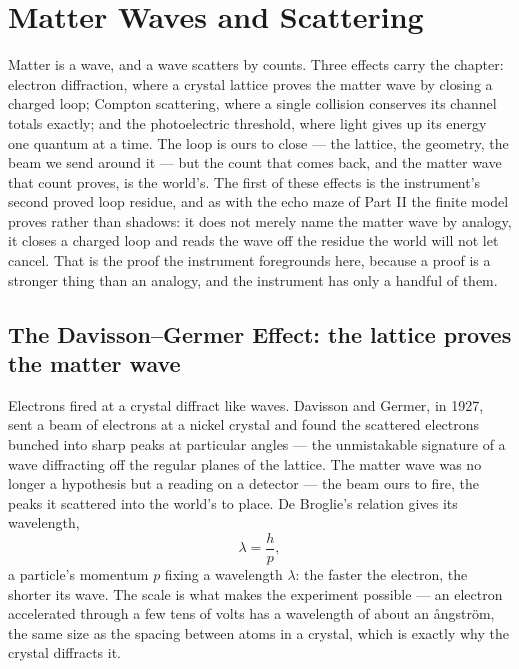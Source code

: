 \chapter{Matter Waves and Scattering}
\label{chap:matter-waves-and-scattering}

Matter is a wave, and a wave scatters by counts. Three effects carry the chapter: electron diffraction, where
a crystal lattice proves the matter wave by closing a charged loop; Compton scattering, where a single
collision conserves its channel totals exactly; and the photoelectric threshold, where light gives up its
energy one quantum at a time. The loop is ours to close --- the lattice, the geometry, the beam we send around
it --- but the count that comes back, and the matter wave that count proves, is the world's. The first of these
effects is the instrument's second proved loop residue, and as with the echo maze of Part II the finite model
proves rather than shadows: it does not merely name the matter wave by analogy, it closes a charged loop and
reads the wave off the residue the world will not let cancel. That is the proof the instrument foregrounds
here, because a proof is a stronger thing than an analogy, and the instrument has only a handful of them.

\section{The Davisson--Germer Effect: the lattice proves the matter wave}
\label{se:davisson-germer}

Electrons fired at a crystal diffract like waves. Davisson and Germer, in 1927, sent a beam of electrons at a
nickel crystal and found the scattered electrons bunched into sharp peaks at particular angles --- the
unmistakable signature of a wave diffracting off the regular planes of the lattice. The matter wave was no
longer a hypothesis but a reading on a detector --- the beam ours to fire, the peaks it scattered into the
world's to place. De Broglie's relation gives its wavelength,
\begin{equation}
  \lambda = \frac{h}{p},
\end{equation}
a particle's momentum $p$ fixing a wavelength $\lambda$: the faster the electron, the shorter its wave. The
scale is what makes the experiment possible --- an electron accelerated through a few tens of volts has a
wavelength of about an \aa{}ngstr\"om, the same size as the spacing between atoms in a crystal, which is
exactly why the crystal diffracts it.

